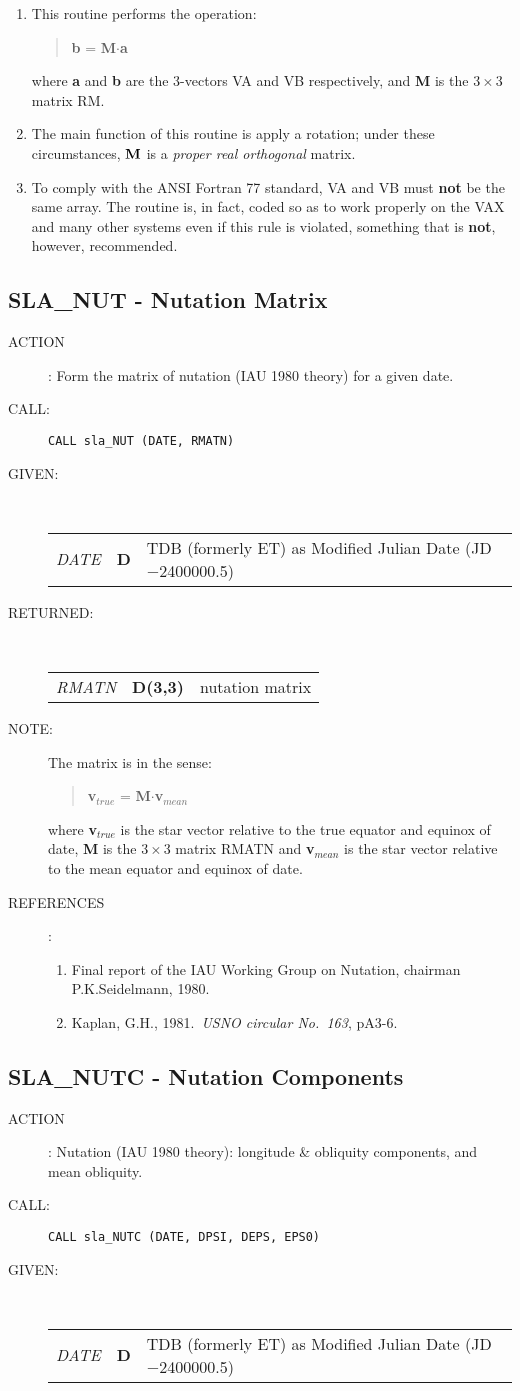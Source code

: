 \documentclass[11pt,twoside]{article}
\newcommand{\xlabel}[1]{}
\newcommand{\routine}[3]
{\hbadness=10000
  \vbox
  {
    \rule{\textwidth}{0.3mm}\\
    {\Large {\bf #1} \hfill #2 \hfill {\bf #1}}\\
    \setlength{\oldspacing}{\topsep}
    \setlength{\topsep}{0.3ex}
    \begin{description}
      #3
    \end{description}
    \setlength{\topsep}{\oldspacing}
  }
}
\renewcommand{\routine}[3]
   {
      \subsection{#1\xlabel{#1} - #2\label{#1}}
       \begin{description}
         #3
       \end{description}
   }
\newcommand{\action}[1]
{\item[ACTION]: #1}
\newcommand{\action}[1]
   {\item[ACTION:] #1}
\newcommand{\call}[1]
{\item[CALL]: \hspace{0.4em}{\tt #1}}
\newlength{\oldspacing}
\renewcommand{\call}[1]
   {
    \item[CALL:] {\tt #1}
   }
\newcommand{\args}[2]
{
  \goodbreak
  \setlength{\oldspacing}{\topsep}
  \setlength{\topsep}{0.3ex}
  \begin{description}
  \item[#1]:\\[1.5ex]
    \begin{tabular}{p{7em}p{6em}p{22em}}
      #2
    \end{tabular}
  \end{description}
  \setlength{\topsep}{\oldspacing}
}
\renewcommand{\args}[2]
   {
     \begin{description}
        \item[#1:]\\
        \begin{tabular}{p{7em}p{6em}l}
           #2
        \end{tabular}
     \end{description}
   }
\newcommand{\spec}[3]
{
  {\em {#1}} & {\bf \mbox{#2}} & {#3}
}
\newcommand{\anote}[1]
{
  \goodbreak
  \setlength{\oldspacing}{\topsep}
  \setlength{\topsep}{0.3ex}
  \begin{description}
    \item[NOTE]:
        #1
  \end{description}
  \setlength{\topsep}{\oldspacing}
}
\renewcommand{\anote}[1]
   {
      \begin{description}
      \item[NOTE:]
          #1
      \end{description}
   }
\newcommand{\refs}[1]
{
  \goodbreak
  \setlength{\oldspacing}{\topsep}
  \setlength{\topsep}{0.3ex}
  \begin{description}
    \item[REFERENCES]:
        #1
  \end{description}
  \setlength{\topsep}{\oldspacing}
}
\newcommand{\refs}[1]
   {
     \begin{description}
       \item[REFERENCES:]
           #1
     \end{description}
   }
\begin{document}
{
 \begin{enumerate}
  \item This routine performs the operation:
        \begin{verse}
         {\bf b} = {\bf M}$\cdot${\bf a}
        \end{verse}
        where {\bf a} and {\bf b} are the 3-vectors VA and VB
        respectively, and {\bf M} is the $3\times3$ matrix RM.
  \item The main function of this routine is apply a
        rotation;  under these circumstances, ${\bf M}$ is a
        {\it proper real orthogonal}\/ matrix.
  \item To comply with the ANSI Fortran 77 standard, VA and VB must
        {\bf not} be the same array.  The routine is, in fact, coded
        so as to work properly on the VAX and many other systems even
        if this rule is violated, something that is {\bf not}, however,
        recommended.
 \end{enumerate}
}
\routine{SLA\_NUT}{Nutation Matrix}
{
 \action{Form the matrix of nutation (IAU 1980 theory) for a given date.}
 \call{CALL sla\_NUT (DATE, RMATN)}
}
\args{GIVEN}
{
 \spec{DATE}{D}{TDB (formerly ET) as Modified Julian Date
                                          (JD$-$2400000.5)}
}
\args{RETURNED}
{
 \spec{RMATN}{D(3,3)}{nutation matrix}
}
\anote{The matrix is in the sense:
       \begin{verse}
        {\bf v}$_{true}$ =  {\bf M}$\cdot${\bf v}$_{mean}$
       \end{verse}
       where {\bf v}$_{true}$ is the star vector relative to the
       true equator and equinox of date, {\bf M} is the
       $3\times3$ matrix RMATN and
       {\bf v}$_{mean}$ is the star vector relative to the
       mean equator and equinox of date.}
\refs
{
 \begin{enumerate}
  \item Final report of the IAU Working Group on Nutation,
        chairman P.K.Seidelmann, 1980.
  \item Kaplan, G.H., 1981.\ {\it USNO circular No.\ 163}, pA3-6.
 \end{enumerate}
}
\routine{SLA\_NUTC}{Nutation Components}
{
 \action{Nutation (IAU 1980 theory):  longitude \& obliquity
         components, and mean obliquity.}
 \call{CALL sla\_NUTC (DATE, DPSI, DEPS, EPS0)}
}
\args{GIVEN}
{
 \spec{DATE}{D}{TDB (formerly ET) as Modified Julian Date
                                           (JD$-$2400000.5)}
}
\end{document}
